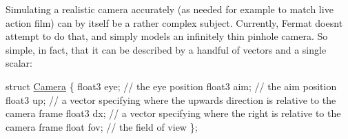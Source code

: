 \begin{DoxyParagraph}{}
Simulating a realistic camera accurately (as needed for example to match live action film) can by itself be a rather complex subject. Currently, Fermat doesn\textquotesingle{}t attempt to do that, and simply models an infinitely thin pinhole camera. So simple, in fact, that it can be described by a handful of vectors and a single scalar\+: ~\newline

\begin{DoxyCode}
\textcolor{keyword}{struct }\hyperlink{struct_camera}{Camera}
\{
    float3  eye;    \textcolor{comment}{// the eye position}
    float3  aim;    \textcolor{comment}{// the aim position}
    float3  up;     \textcolor{comment}{// a vector specifying where the upwards direction is relative to the camera frame}
    float3  dx;     \textcolor{comment}{// a vector specifying where the right is relative to the camera frame}
    \textcolor{keywordtype}{float}   fov;    \textcolor{comment}{// the field of view}
\};
\end{DoxyCode}
 
\end{DoxyParagraph}
